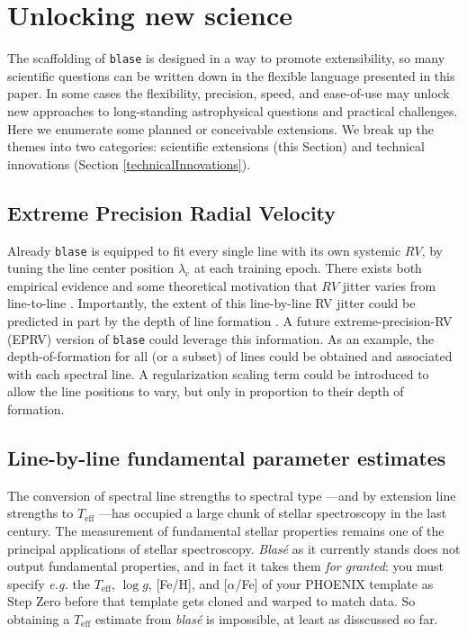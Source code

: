 \documentclass[trackchanges]{aastex631}
\begin{document}
\section{Unlocking new science}\label{secFutureWork}

The scaffolding of \texttt{blase} is designed in a way to promote extensibility, so many scientific questions can be written down in the flexible language presented in this paper.  In some cases the flexibility, precision, speed, and ease-of-use may unlock new approaches to long-standing astrophysical questions and practical challenges. Here we enumerate some planned or conceivable extensions.  We break up the themes into two categories: scientific extensions (this Section) and technical innovations (Section \ref{technicalInnovations}).

\subsection{Extreme Precision Radial Velocity} \label{eprv}

Already \texttt{blase} is equipped to fit every single line with its own systemic $RV$, by tuning the line center position $\lambda_\mathrm{c}$ at each training epoch.  There exists both empirical evidence and some theoretical motivation that $RV$ jitter varies from line-to-line \citep{2018A&A...620A..47D}.  Importantly, the extent of this line-by-line RV jitter could be predicted in part by the depth of line formation \citep{2021A&A...653A..43C, 2022A&A...664A..34A}.  A future extreme-precision-RV (EPRV) version of \texttt{blase} could leverage this information.  As an example, the depth-of-formation for all (or a subset) of lines could be obtained and associated with each spectral line.  A regularization scaling term could be introduced to allow the line positions to vary, but only in proportion to their depth of formation.

\subsection{Line-by-line fundamental parameter estimates}
The conversion of spectral line strengths to spectral type \citep{1901AnHar..28..129C}---and by extension line strengths to $T_\mathrm{eff}$ \citep{1925PhDT.........1P}---has occupied a large chunk of stellar spectroscopy in the last century.  The measurement of fundamental stellar properties remains one of the principal applications of stellar spectroscopy.   \emph{Blas\'e} as it currently stands does not output fundamental properties, and in fact it takes them \emph{for granted}: you must specify \emph{e.g.} the $T_\mathrm{eff}$, $\log{g}$, [Fe/H], and [$\alpha$/Fe] of your PHOENIX template as Step Zero before that template gets cloned and warped to match data.  So obtaining a $T_\mathrm{eff}$ estimate from  \emph{blas\'e} is impossible, at least as disscussed so far.
\end{document}
